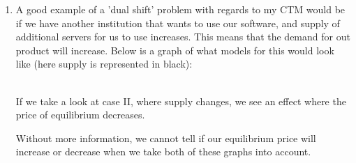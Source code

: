 \documentclass[12pt]{article}
\begin{document}
\begin{enumerate}
\item
    A good example of a 'dual shift' problem with regards to my CTM would be if we have another institution that wants to use our software, and supply of additional servers for us to use increases. This means that the demand for out product will increase. Below is a graph of what models for this would look like (here supply is represented in black): \\


\hfill \\
If we take a look at case II, where supply changes, we see an effect where the price of equilibrium decreases. 


Without more information, we cannot tell if our equilibrium price will increase or decrease when we take both of these graphs into account.


\end{enumerate}
\end{document}
